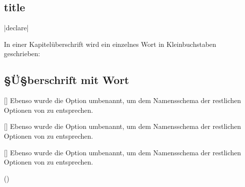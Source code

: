 \documentclass[english,ngerman,ToDo=no]{tudscrman3}
\begin{document}
\section{title}

|declare|

\makeatletter
\meaning\@currentHref


\begin{Example}
In einer Kapitelüberschrift wird ein einzelnes Wort in Kleinbuchstaben 
geschrieben:
\begin{Code}[escapechar=§]
\chapter{§Ü§berschrift mit  Wort}
\end{Code}
\end{Example}

\meaning\@currentHref

\begin{Declaration}[v2.00]{[\PBoolean]}
%
Ebenso wurde die Option  umbenannt, um dem Namensschema der 
restlichen Optionen von \TUDScript zu entsprechen.
\end{Declaration}

\begin{SubDeclaration}{}
\begin{Declaration}[v2.00]{[\PBoolean]}
%
Ebenso wurde die Option  umbenannt, um dem Namensschema der 
restlichen Optionen von \TUDScript zu entsprechen.

  

\end{Declaration}
\begin{Declaration}[v2.00]{[\PBoolean]}
\printdeclarationlist%
%
Ebenso wurde die Option  umbenannt, um dem Namensschema der 
restlichen Optionen von \TUDScript zu entsprechen.
\end{Declaration}

\Blindtext

  

\end{SubDeclaration}

\Blindtext

() 
\end{document}
